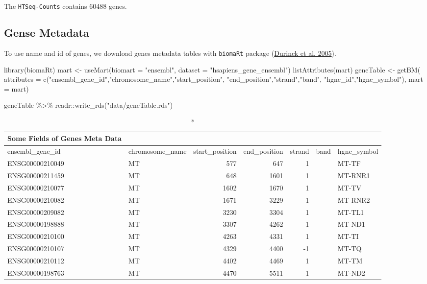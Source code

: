\documentclass[
]{book}
\newenvironment{Shaded}{\begin{snugshade}}{\end{snugshade}}
\newcommand{\AttributeTok}[1]{\textcolor[rgb]{0.77,0.63,0.00}{#1}}
\newcommand{\FunctionTok}[1]{\textcolor[rgb]{0.00,0.00,0.00}{#1}}
\newcommand{\NormalTok}[1]{#1}
\newcommand{\OtherTok}[1]{\textcolor[rgb]{0.56,0.35,0.01}{#1}}
\newcommand{\SpecialCharTok}[1]{\textcolor[rgb]{0.00,0.00,0.00}{#1}}
\newcommand{\StringTok}[1]{\textcolor[rgb]{0.31,0.60,0.02}{#1}}
\begin{document}
The \texttt{HTSeq-Counts} contains 60488 genes.

\hypertarget{gense-metadata}{%
\subsection{Gense Metadata}\label{gense-metadata}}

To use name and id of genes, we download genes metadata tables with \texttt{biomaRt} package (\protect\hyperlink{ref-BioMart}{Durinck et al. 2005}).

\begin{Shaded}
\begin{Highlighting}[]
\FunctionTok{library}\NormalTok{(biomaRt)}
\NormalTok{mart }\OtherTok{\textless{}{-}} \FunctionTok{useMart}\NormalTok{(}\AttributeTok{biomart =} \StringTok{"ensembl"}\NormalTok{, }\AttributeTok{dataset =} \StringTok{"hsapiens\_gene\_ensembl"}\NormalTok{)}
\FunctionTok{listAttributes}\NormalTok{(mart)}
\NormalTok{geneTable }\OtherTok{\textless{}{-}} \FunctionTok{getBM}\NormalTok{(}
  \AttributeTok{attributes =} \FunctionTok{c}\NormalTok{(}\StringTok{"ensembl\_gene\_id"}\NormalTok{,}\StringTok{"chromosome\_name"}\NormalTok{,}\StringTok{"start\_position"}\NormalTok{,}
                 \StringTok{"end\_position"}\NormalTok{,}\StringTok{"strand"}\NormalTok{,}\StringTok{"band"}\NormalTok{,}
                 \StringTok{"hgnc\_id"}\NormalTok{,}\StringTok{"hgnc\_symbol"}\NormalTok{),}
                       \AttributeTok{mart =}\NormalTok{ mart)}

\NormalTok{geneTable }\SpecialCharTok{\%\textgreater{}\%} 
\NormalTok{  readr}\SpecialCharTok{::}\FunctionTok{write\_rds}\NormalTok{(}\StringTok{"data/geneTable.rds"}\NormalTok{)}
\end{Highlighting}
\end{Shaded}

\captionsetup[table]{labelformat=empty,skip=1pt}
\begin{longtable}{llrrrll}
\caption*{
{\large Some Fields of Genes Meta Data}
} \\ 
\toprule
ensembl\_gene\_id & chromosome\_name & start\_position & end\_position & strand & band & hgnc\_symbol \\ 
\midrule
ENSG00000210049 & MT & 577 & 647 & 1 &  & MT-TF \\ 
ENSG00000211459 & MT & 648 & 1601 & 1 &  & MT-RNR1 \\ 
ENSG00000210077 & MT & 1602 & 1670 & 1 &  & MT-TV \\ 
ENSG00000210082 & MT & 1671 & 3229 & 1 &  & MT-RNR2 \\ 
ENSG00000209082 & MT & 3230 & 3304 & 1 &  & MT-TL1 \\ 
ENSG00000198888 & MT & 3307 & 4262 & 1 &  & MT-ND1 \\ 
ENSG00000210100 & MT & 4263 & 4331 & 1 &  & MT-TI \\ 
ENSG00000210107 & MT & 4329 & 4400 & -1 &  & MT-TQ \\ 
ENSG00000210112 & MT & 4402 & 4469 & 1 &  & MT-TM \\ 
ENSG00000198763 & MT & 4470 & 5511 & 1 &  & MT-ND2 \\ 
 \bottomrule
\end{longtable}
\end{document}
